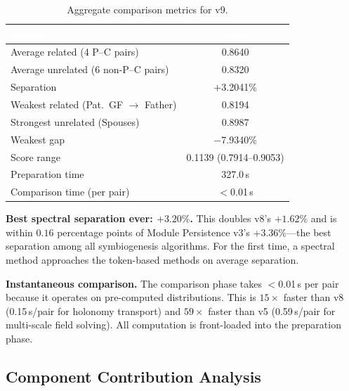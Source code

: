 \documentclass{../yalumba}
\begin{document}
\begin{table}[H]
  \centering
  \tablestyle
  \caption{Aggregate comparison metrics for v9.}
  \label{tab:summary-metrics}
  \begin{tabular}{lc}
    \toprule
    \rowcolor{table-header}
    \textcolor{white}{\textbf{Metric}} &
    \textcolor{white}{\textbf{Value}} \\
    \midrule
    Average related (4 P--C pairs) & 0.8640 \\
    Average unrelated (6 non-P--C pairs) & 0.8320 \\
    Separation & $+$3.2041\% \\
    Weakest related (Pat.~GF $\to$ Father) & 0.8194 \\
    Strongest unrelated (Spouses) & 0.8987 \\
    Weakest gap & $-$7.9340\% \\
    Score range & 0.1139 (0.7914--0.9053) \\
    Preparation time & 327.0\,s \\
    Comparison time (per pair) & $<$0.01\,s \\
    \bottomrule
  \end{tabular}
\end{table}

\begin{keyfinding}
\textbf{Best spectral separation ever: $+3.20\%$.}  This doubles v8's
$+1.62\%$ and is within $0.16$ percentage points of Module Persistence v3's
$+3.36\%$---the best separation among all symbiogenesis algorithms.  For
the first time, a spectral method approaches the token-based methods on
average separation.
\end{keyfinding}

\begin{keyfinding}
\textbf{Instantaneous comparison.}  The comparison phase takes $<$0.01\,s
per pair because it operates on pre-computed distributions.  This is
$15\times$ faster than v8 (0.15\,s/pair for holonomy transport) and
$59\times$ faster than v5 (0.59\,s/pair for multi-scale field solving).
All computation is front-loaded into the preparation phase.
\end{keyfinding}

\subsection{Component Contribution Analysis}
\end{document}
